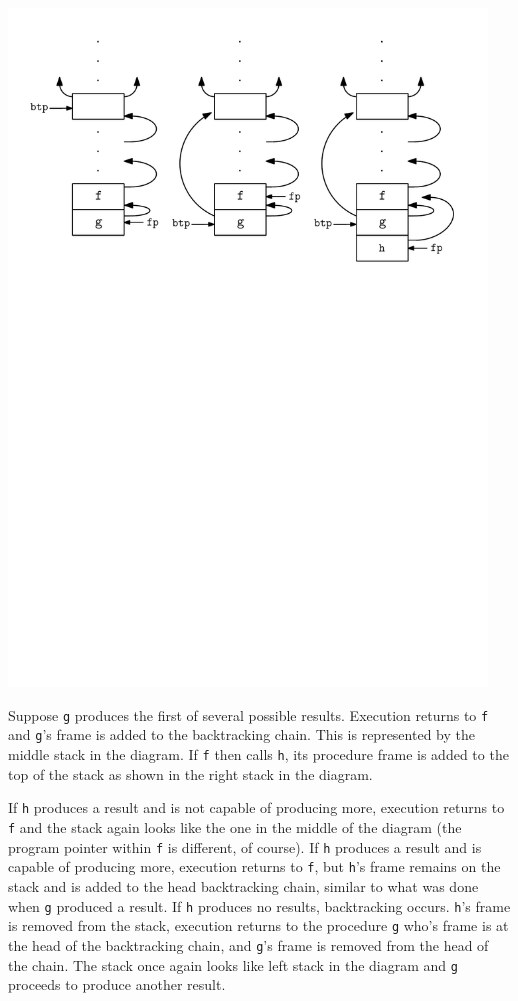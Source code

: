 {\centering{}
\includegraphics[width=5in]{ib-img/BackTrackingChain.pdf}
 
\par}


Suppose \texttt{g} produces the first of several possible
results. Execution returns to \texttt{f} and \texttt{g}'s frame is
added to the backtracking chain. This is represented by the middle
stack in the diagram. If \texttt{f} then calls \texttt{h}, its
procedure frame is added to the top of the stack as shown in the right
stack in the diagram.

If \texttt{h} produces a result and is not capable of producing more,
execution returns to \texttt{f} and the stack again looks like the one
in the middle of the diagram (the program pointer within \texttt{f} is
different, of course). If \texttt{h} produces a result and is capable
of producing more, execution returns to \texttt{f}, but \texttt{h}'s
frame remains on the stack and is added to the head backtracking
chain, similar to what was done when \texttt{g} produced a result.
If \texttt{h} produces no results, backtracking occurs.  \texttt{h}'s
frame is removed from the stack, execution returns to the
procedure \texttt{g} who's frame is at the head of the backtracking
chain, and \texttt{g}'s frame is removed from the head of the
chain. The stack once again looks like left stack in the diagram
and \texttt{g} proceeds to produce another result.


